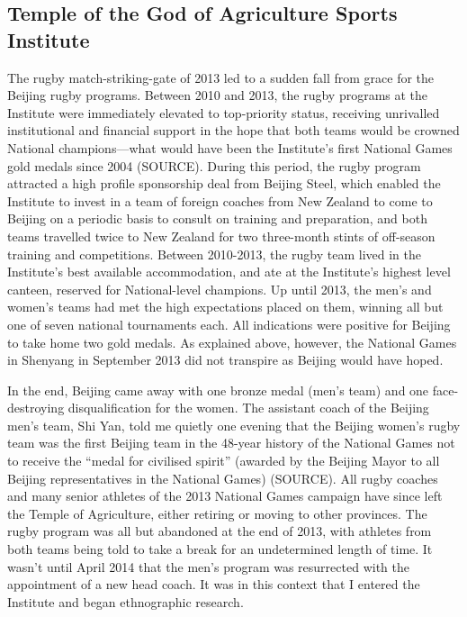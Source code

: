 \begin{CJK}{UTF8}{gbsn}
\subsection{Temple of the God of Agriculture Sports Institute}
The rugby match-striking-gate of 2013 led to a sudden fall from grace for the Beijing rugby programs.  Between 2010 and 2013, the rugby programs at the Institute were immediately elevated to top-priority status, receiving unrivalled institutional and financial support in the hope that both teams would be crowned National champions---what would have been the Institute's first National Games gold medals since 2004 (SOURCE).  During this period, the rugby program attracted a high profile sponsorship deal from Beijing Steel, which enabled the Institute to invest in a team of foreign coaches from New Zealand to come to Beijing on a periodic basis to consult on training and preparation, and both teams travelled twice to New Zealand for two three-month stints of off-season training and competitions.  Between 2010-2013, the rugby team lived in the Institute's best available accommodation, and ate at the Institute's highest level canteen, reserved for National-level champions.  Up until 2013, the men's and women's teams had met the high expectations placed on them, winning all but one of seven national tournaments each. All indications were positive for Beijing to take home two gold medals. As explained above, however, the National Games in Shenyang in September 2013 did not transpire as Beijing would have hoped.

In the end, Beijing came away with one bronze medal (men's team) and one face-destroying disqualification for the women.  The assistant coach of the Beijing men's team, Shi Yan, told me quietly one evening that the Beijing women's rugby team was the first Beijing team in the 48-year history of the National Games not to receive the ``medal for civilised spirit''  (awarded by the Beijing Mayor to all Beijing representatives in the National Games) (SOURCE).  All rugby coaches and many senior athletes of the 2013 National Games campaign have since left the Temple of Agriculture, either retiring or moving to other provinces.  The rugby program was all but abandoned at the end of 2013, with athletes from both teams being told to take a break for an undetermined length of time.  It wasn't until April 2014 that the men's program was resurrected with the appointment of a new head coach.  It was in this context that I entered the Institute and began ethnographic research.




\end{CJK}
